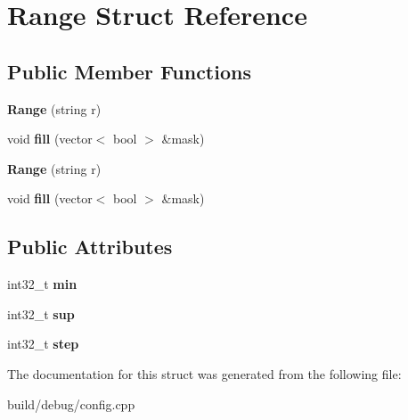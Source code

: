 \hypertarget{structRange}{\section{Range Struct Reference}
\label{structRange}
}
\subsection*{Public Member Functions}
\begin{DoxyCompactItemize}
\item 
\hypertarget{structRange_a5466a03ba0e972866d4c08fb3599d2f7}{{\bfseries Range} (string r)}\label{structRange_a5466a03ba0e972866d4c08fb3599d2f7}

\item 
\hypertarget{structRange_a91b2b995792edfbc9b316913ecdc040a}{void {\bfseries fill} (vector$<$ bool $>$ \&mask)}\label{structRange_a91b2b995792edfbc9b316913ecdc040a}

\item 
\hypertarget{structRange_a5466a03ba0e972866d4c08fb3599d2f7}{{\bfseries Range} (string r)}\label{structRange_a5466a03ba0e972866d4c08fb3599d2f7}

\item 
\hypertarget{structRange_a91b2b995792edfbc9b316913ecdc040a}{void {\bfseries fill} (vector$<$ bool $>$ \&mask)}\label{structRange_a91b2b995792edfbc9b316913ecdc040a}

\end{DoxyCompactItemize}
\subsection*{Public Attributes}
\begin{DoxyCompactItemize}
\item 
\hypertarget{structRange_afdf136475b38c534aea4a8c257b733da}{int32\-\_\-t {\bfseries min}}\label{structRange_afdf136475b38c534aea4a8c257b733da}

\item 
\hypertarget{structRange_a32a05af54e4f3c873c5efd8cca48f646}{int32\-\_\-t {\bfseries sup}}\label{structRange_a32a05af54e4f3c873c5efd8cca48f646}

\item 
\hypertarget{structRange_afae5ec5f48fe85b30c0c574355a0d145}{int32\-\_\-t {\bfseries step}}\label{structRange_afae5ec5f48fe85b30c0c574355a0d145}

\end{DoxyCompactItemize}


The documentation for this struct was generated from the following file\-:\begin{DoxyCompactItemize}
\item 
build/debug/config.\-cpp\end{DoxyCompactItemize}
